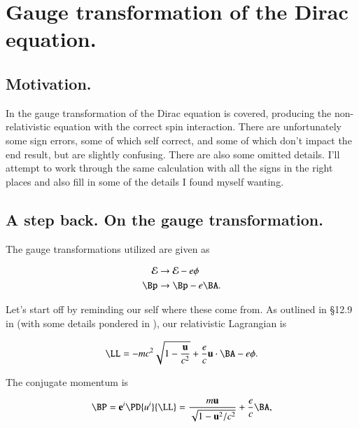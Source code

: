 %
%

\chapter{Gauge transformation of the Dirac equation.}
\label{chap:diracGauge}
{}
\date{Aug 4, 2011}

\beginArtWithToc

\section{Motivation.}

In \cite{desai2009quantum} the gauge transformation of the Dirac equation is covered, producing the non-relativistic equation with the correct spin interaction.  There are unfortunately some sign errors, some of which self correct, and some of which don't impact the end result, but are slightly confusing.  There are also some omitted details.  I'll attempt to work through the same calculation with all the signs in the right places and also fill in some of the details I found myself wanting.

\section{A step back.  On the gauge transformation.}

The gauge transformations utilized are given as

\begin{align}\label{eqn:diracGauge:10}
\mathcal{E} &\rightarrow \mathcal{E} - e \phi \\
\Bp &\rightarrow \Bp - e \BA.
\end{align}

Let's start off by reminding our self where these come from.  As outlined in \S 12.9 in \cite{jackson1975cew} (with some details pondered in \citep{phy354:hamiltonian}), our relativistic Lagrangian is

\begin{equation}\label{eqn:diracGauge:30}
\LL = -m c^2 \sqrt{ 1 - \frac{\Bu}{c^2}} + \frac{e}{c} \Bu \cdot \BA - e \phi.
\end{equation}

The conjugate momentum is

\begin{equation}\label{eqn:diracGauge:50}
\BP = \Be^i \PD{u^i}{\LL} = \frac{m \Bu}{\sqrt{1 - \Bu^2/c^2}} + \frac{e}{c} \BA,
\end{equation}

